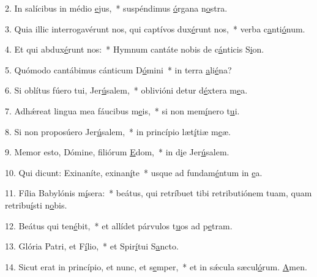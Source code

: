 2. In salícibus in médio \uline{e}jus,~* suspéndimus \uline{ó}rgana n\uline{o}stra.\par 
3. Quia illic interrogavérunt nos, qui captívos dux\uline{é}runt nos,~* verba c\uline{a}nti\uline{ó}num.\par 
4. Et qui abdux\uline{é}runt nos:~* Hymnum cantáte nobis de c\uline{á}nticis S\uline{i}on.\par 
5. Quómodo cantábimus cánticum D\uline{ó}mini~* in terra \uline{a}li\uline{é}na?\par 
6. Si oblítus fúero tui, Jer\uline{ú}salem,~* oblivióni detur d\uline{é}xtera m\uline{e}a.\par 
7. Adhǽreat lingua mea fáucibus m\uline{e}is,~* si non mem\uline{í}nero t\uline{u}i.\par 
8. Si non proposúero Jer\uline{ú}salem,~* in princípio læt\uline{í}tiæ m\uline{e}æ.\par 
9. Memor esto, Dómine, filiórum \uline{E}dom,~* in d\uline{i}e Jer\uline{ú}salem.\par 
10. Qui dicunt: Exinaníte, exinan\uline{í}te~* usque ad fundam\uline{é}ntum in \uline{e}a.\par 
11. Fília Babylónis m\uline{í}sera:~* beátus, qui retríbuet tibi retributiónem tuam, quam retribu\uline{í}sti n\uline{o}bis.\par 
12. Beátus qui ten\uline{é}bit,~* et allídet párvulos t\uline{u}os ad p\uline{e}tram.\par 
13. Glória Patri, et F\uline{í}lio,~* et Spir\uline{í}tui S\uline{a}ncto.\par 
14. Sicut erat in princípio, et nunc, et s\uline{e}mper,~* et in sǽcula sæcul\uline{ó}rum. \uline{A}men.\par 
